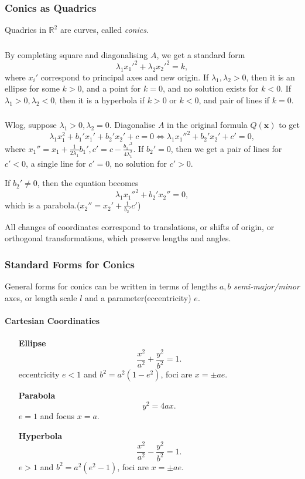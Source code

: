 \documentclass[a4paper]{article}
\begin{document}
    \subsubsection{Conics as Quadrics}
    Quadrics in $ \mathbb{R}^{2} $ are curves, called \textit{conics}.
    \subsubsection*{}
    By completing square and diagonalising $A$, we get a standard form
    \[
      \lambda_1 x_1'^2+\lambda_2 x_2'^2=k,
    \]
    where $ x_i' $ correspond to principal axes and new origin. If $
    \lambda_1,\lambda_2>0 $, then it is an ellipse for some $k>0$,
    and a point for $k=0$, and no solution exists for $k<0$. If $
    \lambda_1>0,\lambda_2<0 $, then it is a hyperbola if $k>0$ or
    $k<0$, and pair of lines if $k=0$.
    \subsubsection*{}
    Wlog, suppose $ \lambda_1>0,\lambda_2=0 $. Diagonalise $A$ in the
    original formula $Q(\mathbf{x})$ to get
    \[
      \lambda_1 x_1^2+b_1'x_1'+b_2'x_2'+c=0 \Longleftrightarrow
      \lambda_1 x_1''^2+b_2'x_2'+c'=0,
    \]
    where $ x_1''=x_1+\frac{1}{2\lambda_1} b_1',
    c'=c-\frac{b_1'^2}{4\lambda_1^2} $. If $ b_2'=0 $, then we get a
    pair of lines for $c'<0$, a single line for $c'=0$, no solution for $c'>0$.

    If $ b_2'\neq 0 $, then the equation becomes
    \[
      \lambda_1 x_1''^2+b_2'x_2''=0,
    \]
    which is a parabola.($ x_2''=x_2'+\frac{1}{b_2'}c' $)

    All changes of coordinates correspond to translations, or shifts
    of origin, or orthogonal transformations, which preserve lengths and angles.
    \subsubsection{Standard Forms for Conics}
    General forms for conics can be written in terms of lengths $a,b$
    \textit{semi-major/minor} axes, or length scale $l$ and a
    parameter(eccentricity) $e$.

    \paragraph{Cartesian Coordinaties}
    \begin{enumerate}[align=left]
      \item[\bfseries Ellipse]
        \[
          \frac{x^2}{a^2}+\frac{y^2}{b^2}=1.
        \]
        eccentricity $e<1$ and $ b^2=a^2(1-e^2) $, foci are $ x=\pm ae $.

      \item[\bfseries Parabola]
        \[
          y^2=4ax.
        \]
        $e=1$ and focus $ x=a $.
      \item[\bfseries Hyperbola]
        \[
          \frac{x^2}{a^2}-\frac{y^2}{b^2}=1.
        \]
        $e>1$ and $ b^2=a^2(e^2-1) $, foci are $ x=\pm ae $.
    \end{enumerate}
\end{document}
